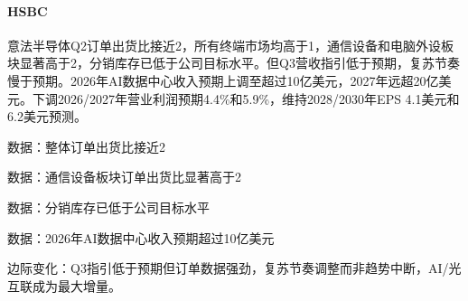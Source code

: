 \documentclass[11pt]{ctexart}
\begin{document}
\paragraph{HSBC} 意法半导体Q2订单出货比接近2，所有终端市场均高于1，通信设备和电脑外设板块显著高于2，分销库存已低于公司目标水平。但Q3营收指引低于预期，复苏节奏慢于预期。2026年AI数据中心收入预期上调至超过10亿美元，2027年远超20亿美元。下调2026/2027年营业利润预期4.4\%和5.9\%，维持2028/2030年EPS 4.1美元和6.2美元预测。
{\small\color{refgray}数据：整体订单出货比接近2\par}
{\small\color{refgray}数据：通信设备板块订单出货比显著高于2\par}
{\small\color{refgray}数据：分销库存已低于公司目标水平\par}
{\small\color{refgray}数据：2026年AI数据中心收入预期超过10亿美元\par}
{\small\color{refgray}边际变化：Q3指引低于预期但订单数据强劲，复苏节奏调整而非趋势中断，AI/光互联成为最大增量。\par}
\end{document}
